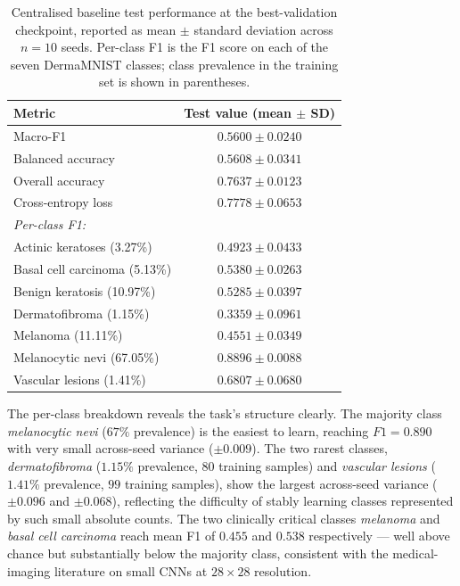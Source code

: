 \documentclass[11pt,a4paper]{report}
\begin{document}
\begin{table}[!htbp]
\centering
\caption{Centralised baseline test performance at the
best-validation checkpoint, reported as mean $\pm$ standard
deviation across $n=10$ seeds. Per-class F1 is the F1 score on
each of the seven DermaMNIST classes; class prevalence in the
training set is shown in parentheses.}
\label{tab:centralised-results}
\small
\begin{tabular}{lc}
\toprule
Metric & Test value (mean $\pm$ SD) \\
\midrule
Macro-F1                        & $\mathbf{0.5600 \pm 0.0240}$ \\
Balanced accuracy               & $0.5608 \pm 0.0341$ \\
Overall accuracy                & $0.7637 \pm 0.0123$ \\
Cross-entropy loss              & $0.7778 \pm 0.0653$ \\
\midrule
\multicolumn{2}{l}{\textit{Per-class F1:}} \\
\quad Actinic keratoses (3.27\%)              & $0.4923 \pm 0.0433$ \\
\quad Basal cell carcinoma (5.13\%)           & $0.5380 \pm 0.0263$ \\
\quad Benign keratosis (10.97\%)              & $0.5285 \pm 0.0397$ \\
\quad Dermatofibroma (1.15\%)                 & $0.3359 \pm 0.0961$ \\
\quad Melanoma (11.11\%)                      & $0.4551 \pm 0.0349$ \\
\quad Melanocytic nevi (67.05\%)              & $0.8896 \pm 0.0088$ \\
\quad Vascular lesions (1.41\%)               & $0.6807 \pm 0.0680$ \\
\bottomrule
\end{tabular}
\end{table}

The per-class breakdown reveals the task's structure clearly.
The majority class \emph{melanocytic nevi} ($67\%$ prevalence)
is the easiest to learn, reaching $F1 = 0.890$ with very small
across-seed variance ($\pm 0.009$). The two rarest classes,
\emph{dermatofibroma} ($1.15\%$ prevalence, $80$ training
samples) and \emph{vascular lesions} ($1.41\%$ prevalence,
$99$ training samples), show the largest across-seed variance
($\pm 0.096$ and $\pm 0.068$), reflecting the difficulty of
stably learning classes represented by such small absolute
counts. The two clinically critical classes \emph{melanoma}
and \emph{basal cell carcinoma} reach mean F1 of $0.455$ and
$0.538$ respectively --- well above chance but substantially
below the majority class, consistent with the medical-imaging
literature on small CNNs at $28\times28$ resolution.
\end{document}

